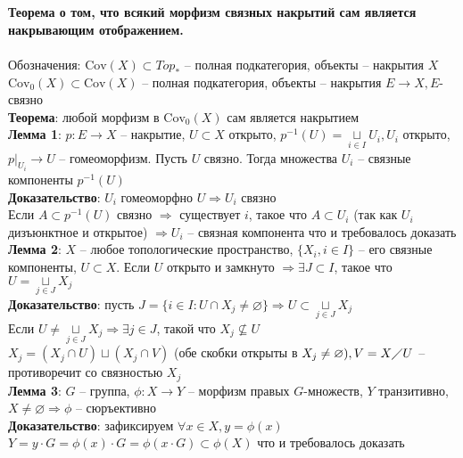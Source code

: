 \section{}
	\textbf{Теорема о том, что всякий морфизм связных накрытий сам является накрывающим отображением.}\\
	\\
	Обозначения: $\text{Cov} (X) \subset Top_{\ast}$ -- полная подкатегория, объекты -- накрытия $X$\\
	$\text{Cov}_0 (X) \subset \text{Cov}(X)$ -- полная подкатегория, объекты -- накрытия $E\rightarrow X, E$- связно\\
	\textbf{Теорема}: любой морфизм в $\text{Cov}_0 (X)$ сам является накрытием\\
	\textbf{Лемма 1}: $p: E\rightarrow X$ -- накрытие, $U\subset X$ открыто, $p^{-1} (U) = \underset{i\in I}{\sqcup} U_i, U_i$ открыто, ${p|}_{U_i} \rightarrow U$ -- гомеоморфизм. Пусть $U$ связно. Тогда множества $U_i$ -- связные компоненты $p^{-1} (U)$\\
	\textbf{Доказательство}: $U_i$ гомеоморфно $U \Rightarrow U_i$ связно\\
	Если $A\subset p^{-1} (U)$ связно $\Rightarrow$ существует $i$, такое что $A\subset U_i$ (так как $U_i$ дизъюнктное и открытое) $\Rightarrow U_i$ -- связная компонента что и требовалось доказать\\
	\textbf{Лемма 2}: $X$ -- любое топологические пространство, $\{X_i, i\in I\}$ -- его связные компоненты, $U\subset X$. Если $U$ открыто и замкнуто $\Rightarrow \exists J\subset I$, такое что $U = \underset{j\in J}{\sqcup} X_j$\\
	\textbf{Доказательство}: пусть $J = \{i\in I: U\cap X_j \neq \varnothing\} \Rightarrow U \subset \underset{j\in J}{\sqcup} X_j$\\
	Если $U \neq \underset{j\in J}{\sqcup} X_j \Rightarrow \exists j\in J$, такой что $X_j \nsubseteq U$\\
	$X_j = (X_j \cap U) \sqcup (X_j \cap V)$ (обе скобки открыты в $X_j \neq \varnothing), V = X\diagup U$ -- противоречит со связностью $X_j$\\
	\textbf{Лемма 3}: $G$ -- группа, $\phi: X\rightarrow Y$ -- морфизм правых $G$-множеств, $Y$ транзитивно, $X\neq \varnothing \Rightarrow \phi$ -- сюръективно\\
	\textbf{Доказательство}: зафиксируем $\forall x\in X, y = \phi (x)$\\
	$Y = y\cdot G = \phi (x) \cdot G = \phi (x\cdot G) \subset \phi (X)$ что и требовалось доказать\\
